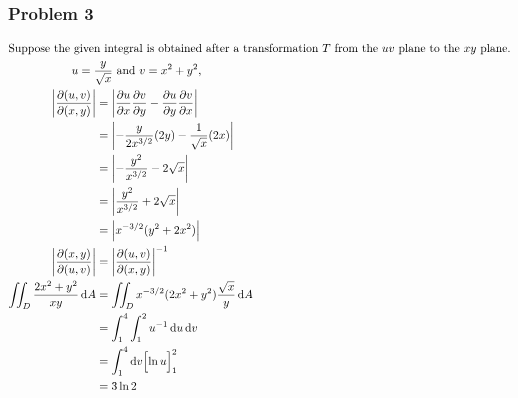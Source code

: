 \documentclass[12pt]{article}
\newcommand*\diff{\mathop{}\!\mathrm{d}}
\begin{document}
\subsubsection*{Problem 3}
\begin{gather*}
	\intertext{Suppose the given integral is obtained after a transformation $T$ from the 
		$uv$ plane to the $xy$ plane.}
	\text{$u = \frac{y}{\sqrt{x}}$ and $v = x^2 + y^2$,} \\
	\begin{align*}
		\left| \frac{\partial (u,v)}{\partial (x,y)} \right| &= 
			\left| 
				\frac{\partial u}{\partial x} \frac{\partial v}{\partial y}
				- \frac{\partial u}{\partial y} \frac{\partial v}{\partial x}
			\right| &\\
		&= \left| -\frac{y}{2x^{3/2}}(2y) - \frac{1}{\sqrt{x}}(2x) \right| \\
		&= \left| -\frac{y^2}{x^{3/2}} - 2\sqrt{x} \right| \\
		&= \left| \frac{y^2}{x^{3/2}} + 2\sqrt{x} \right| \\
		&= \left| x^{-3/2} (y^2+ 2x^2) \right| \\
		\left| \frac{\partial (x,y)}{\partial (u,v)} \right| &= 
			\left| \frac{\partial (u,v)}{\partial (x,y)} \right|^{-1} \\
		\iint_D \frac{2x^2 + y^2}{xy} \diff A &= 
			\iint_D x^{-3/2}(2x^2 + y^2)\frac{\sqrt{x}}{y} \diff A \\
		&= \int_1^4 \int_1^2 u^{-1} \diff u \diff v \\
		&= \int_1^4 \diff v \Bigl[ \ln u \Bigl]_1^2 \\
		&= 3 \ln 2
	\end{align*}
\end{gather*}
\filbreak
\end{document}
